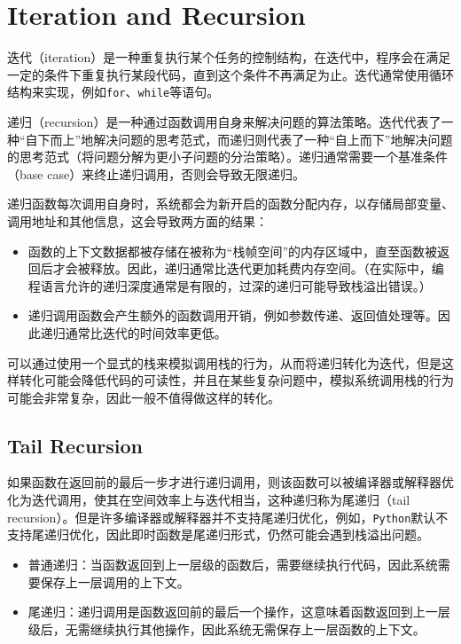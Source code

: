 \section{Iteration and Recursion}
迭代（iteration）是一种重复执行某个任务的控制结构，在迭代中，程序会在满足一定的条件下重复执行某段代码，直到这个条件不再满足为止。迭代通常使用循环结构来实现，例如\texttt{for}、\texttt{while}等语句。

递归（recursion）是一种通过函数调用自身来解决问题的算法策略。迭代代表了一种“自下而上”地解决问题的思考范式，而递归则代表了一种“自上而下”地解决问题的思考范式（将问题分解为更小子问题的分治策略）。递归通常需要一个基准条件（base case）来终止递归调用，否则会导致无限递归。

递归函数每次调用自身时，系统都会为新开启的函数分配内存，以存储局部变量、调用地址和其他信息，这会导致两方面的结果：

\begin{itemize}
    \item 函数的上下文数据都被存储在被称为“栈帧空间”的内存区域中，直至函数被返回后才会被释放。因此，递归通常比迭代更加耗费内存空间。（在实际中，编程语言允许的递归深度通常是有限的，过深的递归可能导致栈溢出错误。）
    \item 递归调用函数会产生额外的函数调用开销，例如参数传递、返回值处理等。因此递归通常比迭代的时间效率更低。
\end{itemize}

可以通过使用一个显式的栈来模拟调用栈的行为，从而将递归转化为迭代，但是这样转化可能会降低代码的可读性，并且在某些复杂问题中，模拟系统调用栈的行为可能会非常复杂，因此一般不值得做这样的转化。

\subsection{Tail Recursion}
如果函数在返回前的最后一步才进行递归调用，则该函数可以被编译器或解释器优化为迭代调用，使其在空间效率上与迭代相当，这种递归称为尾递归（tail recursion）。但是许多编译器或解释器并不支持尾递归优化，例如，\texttt{Python}默认不支持尾递归优化，因此即时函数是尾递归形式，仍然可能会遇到栈溢出问题。

\begin{itemize}
    \item 普通递归：当函数返回到上一层级的函数后，需要继续执行代码，因此系统需要保存上一层调用的上下文。
    \item 尾递归：递归调用是函数返回前的最后一个操作，这意味着函数返回到上一层级后，无需继续执行其他操作，因此系统无需保存上一层函数的上下文。
\end{itemize}


